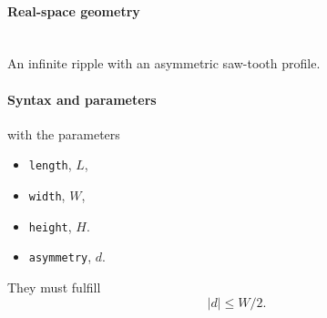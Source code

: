 \paragraph{Real-space geometry}\strut\\
An infinite ripple with an asymmetric saw-tooth profile.

\begin{figure}[h]
\hfill
{}
\hfill
{}
\hfill
\end{figure}

\FloatBarrier

\paragraph{Syntax and parameters}
\begin{quote}
\end{quote}
with the parameters
\begin{itemize}
\item \texttt{length}, $L$, 
\item \texttt{width}, $W$, 
\item \texttt{height}, $H$. 
\item \texttt{asymmetry}, $d$. 
\end{itemize}
They must fulfill
\begin{displaymath}
  |d| \le W/2.
\end{displaymath}


